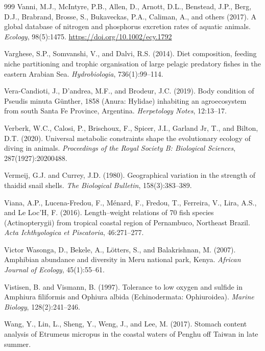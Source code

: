 \begin{thebibliography}{999}
Vanni, M.J., McIntyre, P.B., Allen, D., Arnott, D.L., Benstead, J.P., Berg, D.J., Brabrand, Brosse, S., Bukaveckas, P.A., Caliman, A., and others (2017). A global database of nitrogen and phosphorus excretion rates of aquatic animals. \textit{Ecology}, 98(5):1475. \url{https://doi.org/10.1002/ecy.1792}

Varghese, S.P., Somvanshi, V., and Dalvi, R.S. (2014). Diet composition, feeding niche partitioning and trophic organisation of large pelagic predatory fishes in the eastern Arabian Sea. \textit{Hydrobiologia}, 736(1):99--114.

Vera-Candioti, J., D'andrea, M.F., and Brodeur, J.C. (2019). Body condition of Pseudis minuta G{\"u}nther, 1858 (Anura: Hylidae) inhabiting an agroecosystem from south Santa Fe Province, Argentina. \textit{Herpetology Notes}, 12:13--17.

Verberk, W.C., Calosi, P., Brischoux, F., Spicer, J.I., Garland Jr, T., and Bilton, D.T. (2020). Universal metabolic constraints shape the evolutionary ecology of diving in animals. \textit{Proceedings of the Royal Society B: Biological Sciences}, 287(1927):20200488.

Vermeij, G.J. and Currey, J.D. (1980). Geographical variation in the strength of thaidid snail shells. \textit{The Biological Bulletin}, 158(3):383--389.

Viana, A.P., Lucena-Fredou, F., M{\'e}nard, F., Fredou, T., Ferreira, V., Lira, A.S., and Le Loc'H, F. (2016). Length--weight relations of 70 fish species (Actinopterygii) from tropical coastal region of Pernambuco, Northeast Brazil. \textit{Acta Ichthyologica et Piscatoria}, 46:271--277.

Victor Wasonga, D., Bekele, A., L{\"o}tters, S., and Balakrishnan, M. (2007). Amphibian abundance and diversity in Meru national park, Kenya. \textit{African Journal of Ecology}, 45(1):55--61.

Vistisen, B. and Vismann, B. (1997). Tolerance to low oxygen and sulfide in Amphiura filiformis and Ophiura albida (Echinodermata: Ophiuroidea). \textit{Marine Biology}, 128(2):241--246.

Wang, Y., Lin, L., Sheng, Y., Weng, J., and Lee, M. (2017). Stomach content analysis of Etrumeus micropus in the coastal waters of Penghu off Taiwan in late summer.


\end{thebibliography}
